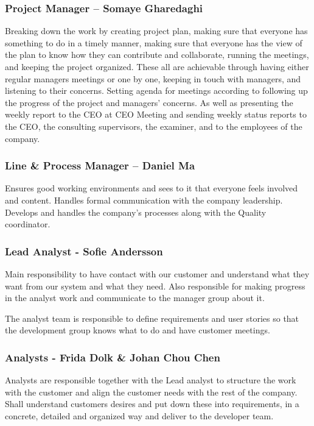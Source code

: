 \subsubsection*{Project Manager – Somaye Gharedaghi} 
Breaking down the work by creating project plan, making sure that everyone has something to do in a timely manner, making sure that everyone has the view of the plan to know how they can contribute and collaborate, running the meetings, and keeping the project organized. These all are achievable through having either regular managers meetings or one by one, keeping in touch with managers, and listening to their concerns. Setting agenda for meetings according to following up the progress of the project and managers’ concerns. As well as presenting the weekly report to the CEO at CEO Meeting and sending weekly status reports to the CEO, the consulting supervisors, the examiner, and to the employees of the company. 

\subsubsection*{Line \& Process Manager – Daniel Ma}
Ensures good working environments and sees to it that everyone feels involved and content. Handles formal communication with the company leadership. Develops and handles the company's processes along with the Quality coordinator.

\subsubsection*{Lead Analyst - Sofie Andersson} 
Main responsibility to have contact with our customer and understand what they want from our system and what they need. Also responsible for making progress in the analyst work and communicate to the manager group about it.  

The analyst team is responsible to define requirements and user stories so that the development group knows what to do and have customer meetings.  

\subsubsection*{Analysts - Frida Dolk \& Johan Chou Chen} 
Analysts are responsible together with the Lead analyst to structure the work with the customer and align the customer needs with the rest of the company. Shall understand customers desires and put down these into requirements, in a concrete, detailed and organized way and deliver to the developer team. 

